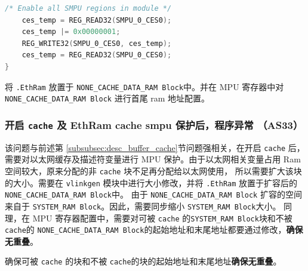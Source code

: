 \begin{lstlisting}[language=C,style=C]
    /* Enable all SMPU regions in module */
    ces_temp = REG_READ32(SMPU_0_CES0);
    ces_temp |= 0x00000001;
    REG_WRITE32(SMPU_0_CES0, ces_temp);
    ces_temp = REG_READ32(SMPU_0_CES0);
}
\end{lstlisting}

\begin{definition}[解决方案]
    将 \lstinline{.EthRam} 放置于 \lstinline{NONE_CACHE_DATA_RAM Block}中。并在 MPU 寄存器中对 \lstinline{NONE_CACHE_DATA_RAM Block} 进行首尾 ram 地址配置。
\end{definition}

\subsubsection{开启 \lstinline{cache} 及 EthRam cache smpu 保护后，程序异常 （AS33）}

该问题与前述第 \ref{subsubsec:desc_buffer_cache}节问题强相关，在开启 \lstinline{cache} 后，需要对以太网缓存及描述符变量进行 MPU 保护。由于以太网相关变量占用 Ram空间较大，原来分配的非 \lstinline{cache} 块不足再分配给以太网使用，
所以需要扩大该块的大小。需要在 \lstinline{vlinkgen} 模块中进行大小修改，并将 \lstinline{.EthRam} 放置于扩容后的 \lstinline{NONE_CACHE_DATA_RAM Block}中。
由于 \lstinline{NONE_CACHE_DATA_RAM Block} 扩容的空间来自于 \lstinline{SYSTEM_RAM Block}。因此，需要同步缩小 \lstinline{SYSTEM_RAM Block}大小。
同理，在 MPU 寄存器配置中，需要对可被 \lstinline{cache} 的\lstinline{SYSTEM_RAM Block}块和不被 \lstinline{cache}的 \lstinline{NONE_CACHE_DATA_RAM Block}的起始地址和末尾地址都要通过修改，\textbf{确保无重叠}。

\begin{definition}[解决方案]
    确保可被 \lstinline{cache} 的块和不被 \lstinline{cache}的块的起始地址和末尾地址\textbf{确保无重叠}。
\end{definition}